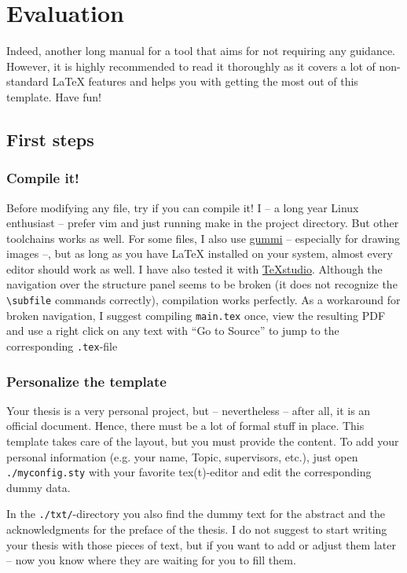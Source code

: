 \documentclass[../main.tex]{subfiles}
\begin{document}
\chapter{Evaluation}

Indeed, another long manual for a tool \cite{Bithappens16Template} that aims for not requiring any guidance.
However, it is highly recommended to read it thoroughly as it covers a lot of non-standard LaTeX features and helps you with getting the most out of this template.
Have fun!

\section{First steps}

\subsection{Compile it!}

Before modifying any file, try if you can compile it!
I -- a long year Linux enthusiast -- prefer vim and just running make in the project directory.
But other toolchains works as well.
For some files, I also use \href{https://github.com/alexandervdm/gummi}{gummi} -- especially for drawing images --, but as long as you have LaTeX installed on your system, almost every editor should work as well.
I have also tested it with \href{http://www.texstudio.org/}{TeXstudio}.
Although the navigation over the structure panel seems to be broken (it does not recognize the \texttt{\textbackslash subfile} commands correctly), compilation works perfectly.
As a workaround for broken navigation, I suggest compiling \texttt{main.tex} once, view the resulting PDF and use a right click on any text with \enquote{Go to Source} to jump to the corresponding \texttt{.tex}-file


\subsection{Personalize the template}

Your thesis is a very personal project, but -- nevertheless -- after all, it is an official document.
Hence, there must be a lot of formal stuff in place.
This template takes care of the layout, but you must provide the content.
To add your personal information (e.g. your name, Topic, supervisors, etc.), just open \texttt{./myconfig.sty} with your favorite tex(t)-editor and edit the corresponding dummy data.

In the \texttt{./txt/}-directory you also find the dummy text for the abstract and the acknowledgments for the preface of the thesis.
I do not suggest to start writing your thesis with those pieces of text, but if you want to add or adjust them later -- now you know where they are waiting for you to fill them.
\end{document}

